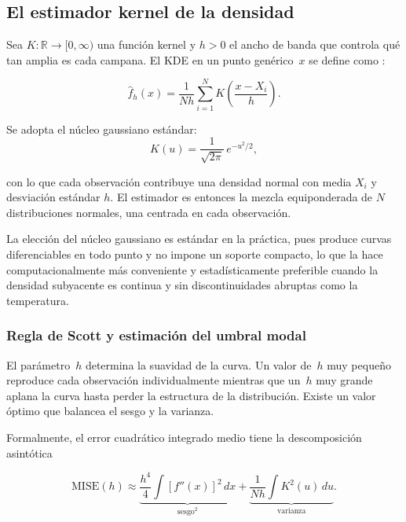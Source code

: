 \documentclass[APA,STIX1COL]{WileyNJD-v2}
\begin{document}
{\subsection{El estimador kernel de la densidad}\label{subsec:kde}

Sea $K:\mathbb{R}\to[0,\infty)$ una funci\'on kernel y $h>0$ el ancho de banda que
controla qu\'e tan amplia es cada campana. El KDE en un punto
gen\'erico~$x$ se define como \citep{rosenblatt1956,parzen1962}:

\begin{equation}\label{eq:kde}
\hat{f}_h(x)
  = \frac{1}{Nh}\sum_{i=1}^{N}
    K\!\left(\frac{x - X_i}{h}\right).
\end{equation}

\medskip

Se adopta el n\'ucleo gaussiano est\'andar:
\begin{equation}\label{eq:kde_gauss}
K(u) = \frac{1}{\sqrt{2\pi}}\,e^{-u^2/2},
\end{equation}

\medskip

con lo que cada observaci\'on contribuye una densidad normal con
media $X_i$ y desviaci\'on est\'andar $h$. El estimador es
entonces la mezcla equiponderada de $N$ distribuciones normales,
una centrada en cada observaci\'on.

La elecci\'on del n\'ucleo gaussiano es est\'andar en la pr\'actica, pues produce curvas
diferenciables en todo punto y no impone un soporte compacto,
lo que la hace computacionalmente m\'as conveniente y
estad\'isticamente preferible cuando la densidad subyacente
es continua y sin discontinuidades abruptas como la temperatura.

\subsubsection{Regla de Scott y estimación del umbral modal}
El par\'ametro~$h$ determina la suavidad de la curva. Un valor
de~$h$ muy peque\~no reproduce cada observaci\'on individualmente mientras que un~$h$
muy grande aplana la curva hasta perder la estructura de la
distribuci\'on. Existe un valor \'optimo que balancea el sesgo y la varianza.

Formalmente, el error cuadr\'atico integrado medio tiene la
descomposici\'on asint\'otica

\begin{equation}\label{eq:mise}
\mathrm{MISE}(h)
  \approx \underbrace{\frac{h^4}{4}
            \int[f''(x)]^2\,dx}_{\mathrm{sesgo}^2}
  + \underbrace{\frac{1}{Nh}
            \int K^2(u)\,du}_{\mathrm{varianza}}.
\end{equation}

}
\end{document}
